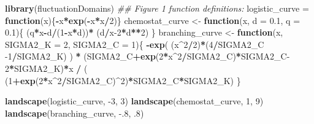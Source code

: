 \documentclass[
]{rescience}
\newenvironment{Shaded}{\begin{snugshade}}{\end{snugshade}}
\newcommand{\CommentTok}[1]{\textcolor[rgb]{0.56,0.35,0.01}{\textit{#1}}}
\newcommand{\ControlFlowTok}[1]{\textcolor[rgb]{0.13,0.29,0.53}{\textbf{#1}}}
\newcommand{\DataTypeTok}[1]{\textcolor[rgb]{0.13,0.29,0.53}{#1}}
\newcommand{\DecValTok}[1]{\textcolor[rgb]{0.00,0.00,0.81}{#1}}
\newcommand{\FloatTok}[1]{\textcolor[rgb]{0.00,0.00,0.81}{#1}}
\newcommand{\KeywordTok}[1]{\textcolor[rgb]{0.13,0.29,0.53}{\textbf{#1}}}
\newcommand{\NormalTok}[1]{#1}
\newcommand{\OperatorTok}[1]{\textcolor[rgb]{0.81,0.36,0.00}{\textbf{#1}}}
\newcommand{\StringTok}[1]{\textcolor[rgb]{0.31,0.60,0.02}{#1}}
\begin{document}
\begin{Shaded}
\begin{Highlighting}[]
\KeywordTok{library}\NormalTok{(fluctuationDomains)}
\CommentTok{## Figure 1 function definitions:}
\NormalTok{logistic_curve =}\StringTok{ }\ControlFlowTok{function}\NormalTok{(x)\{}\OperatorTok{-}\NormalTok{x}\OperatorTok{*}\KeywordTok{exp}\NormalTok{(}\OperatorTok{-}\NormalTok{x}\OperatorTok{*}\NormalTok{x}\OperatorTok{/}\DecValTok{2}\NormalTok{)\}}
\NormalTok{chemostat_curve <-}\StringTok{ }\ControlFlowTok{function}\NormalTok{(x, }\DataTypeTok{d =} \FloatTok{0.1}\NormalTok{, }\DataTypeTok{q =} \FloatTok{0.1}\NormalTok{)\{}
\NormalTok{  (q}\OperatorTok{*}\NormalTok{x}\OperatorTok{-}\NormalTok{d}\OperatorTok{/}\NormalTok{(}\DecValTok{1}\OperatorTok{-}\NormalTok{x}\OperatorTok{*}\NormalTok{d))}\OperatorTok{*}\StringTok{ }\NormalTok{(d}\OperatorTok{/}\NormalTok{x}\DecValTok{-2}\OperatorTok{*}\NormalTok{d}\OperatorTok{**}\DecValTok{2}\NormalTok{)}
\NormalTok{\}}
\NormalTok{branching_curve <-}\StringTok{ }\ControlFlowTok{function}\NormalTok{(x, }\DataTypeTok{SIGMA2_K =} \DecValTok{2}\NormalTok{, }\DataTypeTok{SIGMA2_C =} \DecValTok{1}\NormalTok{)\{}
  \OperatorTok{-}\KeywordTok{exp}\NormalTok{( (x}\OperatorTok{^}\DecValTok{2}\OperatorTok{/}\DecValTok{2}\NormalTok{)}\OperatorTok{*}\NormalTok{(}\DecValTok{4}\OperatorTok{/}\NormalTok{SIGMA2_C }\DecValTok{-1}\OperatorTok{/}\NormalTok{SIGMA2_K) ) }\OperatorTok{*}
\StringTok{    }\NormalTok{(SIGMA2_C}\OperatorTok{+}\KeywordTok{exp}\NormalTok{(}\DecValTok{2}\OperatorTok{*}\NormalTok{x}\OperatorTok{^}\DecValTok{2}\OperatorTok{/}\NormalTok{SIGMA2_C)}\OperatorTok{*}\NormalTok{SIGMA2_C}\DecValTok{-2}\OperatorTok{*}\NormalTok{SIGMA2_K)}\OperatorTok{*}\NormalTok{x }\OperatorTok{/}
\StringTok{    }\NormalTok{( (}\DecValTok{1}\OperatorTok{+}\KeywordTok{exp}\NormalTok{(}\DecValTok{2}\OperatorTok{*}\NormalTok{x}\OperatorTok{^}\DecValTok{2}\OperatorTok{/}\NormalTok{SIGMA2_C)}\OperatorTok{^}\DecValTok{2}\NormalTok{)}\OperatorTok{*}\NormalTok{SIGMA2_C}\OperatorTok{*}\NormalTok{SIGMA2_K)}
\NormalTok{\}}

\KeywordTok{landscape}\NormalTok{(logistic_curve, }\DecValTok{-3}\NormalTok{, }\DecValTok{3}\NormalTok{)}
\KeywordTok{landscape}\NormalTok{(chemostat_curve, }\DecValTok{1}\NormalTok{, }\DecValTok{9}\NormalTok{)}
\KeywordTok{landscape}\NormalTok{(branching_curve, }\FloatTok{-.8}\NormalTok{, }\FloatTok{.8}\NormalTok{)}
\end{Highlighting}
\end{Shaded}
\end{document}
